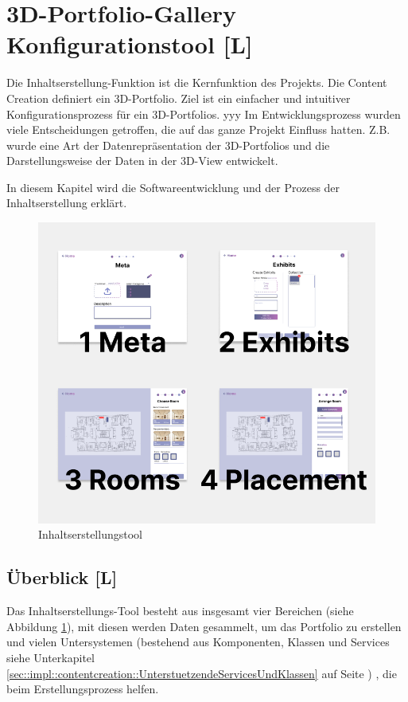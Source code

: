 \section{3D-Portfolio-Gallery Konfigurationstool [L]} \label{Konfigurationstool}

Die Inhaltserstellung-Funktion ist die Kernfunktion des Projekts. Die Content Creation definiert ein 3D-Portfolio. Ziel ist ein einfacher und intuitiver Konfigurationsprozess für ein 3D-Portfolios. 
yyy Im Entwicklungsprozess wurden viele Entscheidungen getroffen, die auf das ganze Projekt Einfluss hatten. Z.B. wurde eine Art der Datenrepräsentation der 3D-Portfolios und die Darstellungsweise der Daten in der 3D-View entwickelt.

In diesem Kapitel wird die Softwareentwicklung und der Prozess der Inhaltserstellung erklärt.

\begin{figure}
    \centering
    \includegraphics[scale=0.5]{pics/CreateCreation4Categories.png}
    \caption{Inhaltserstellungstool}
    \label{fig:impl:creation:fourCategoires}
\end{figure}

\subsection{Überblick [L]}
Das Inhaltserstellungs-Tool besteht aus insgesamt vier Bereichen (siehe Abbildung \ref{fig:impl:creation:fourCategoires}), mit diesen werden Daten gesammelt, um das Portfolio zu erstellen und vielen Untersystemen (bestehend aus Komponenten, Klassen und Services siehe Unterkapitel \ref{sec::impl::contentcreation::UnterstuetzendeServicesUndKlassen} auf Seite \pageref{sec::impl::contentcreation::UnterstuetzendeServicesUndKlassen}) , die beim Erstellungsprozess helfen.

